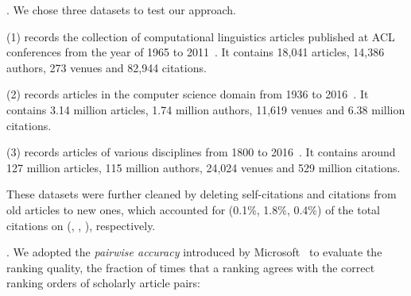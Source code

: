 . We chose three datasets to test our approach.

\noindent
(1) \aan records the collection of computational linguistics articles published at ACL conferences from the year of 1965 to 2011~\cite{Liang16AAAI}.
It contains 18,041 articles, 14,386 authors, 273 venues and 82,944 citations.

\noindent
(2) \aminer records articles in the computer science domain from 1936 to 2016~\cite{Tang:08KDD}.
It contains 3.14 million articles, 1.74 million authors, 11,619 venues and 6.38 million citations.

\noindent
(3) \magdata records articles of various disciplines from 1800 to 2016~\cite{Sinha15:MAG}.
It contains around 127 million articles, 115 million authors, 24,024 venues and 529 million citations.

These datasets were further cleaned by deleting self-citations and citations from old articles to new ones, which accounted for (0.1\%, 1.8\%, 0.4\%) of the total citations on (\aan, \aminer, \magdata), respectively.





.
We adopted the {\em pairwise accuracy} introduced by Microsoft~\cite{Richardson06:BPR,wsdmcup} to evaluate the ranking quality, \ie the fraction of times that a ranking agrees with the correct ranking orders of scholarly article pairs:


